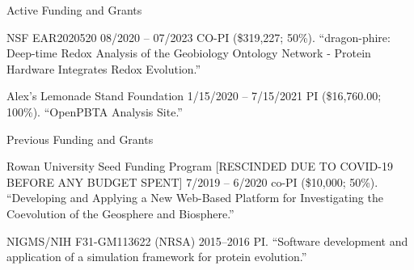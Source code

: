 \documentclass{resume} %
\begin{document}
\vspace*{0.35cm}
\begin{rSection}{Active Funding and Grants}
\vspace*{0.25cm}

\begin{rSubsection}
  {NSF EAR2020520}
  {08/2020 -- 07/2023}
  {CO-PI (\$319,227; 50\%). ``dragon-phire: Deep-time Redox Analysis of the Geobiology Ontology Network - Protein Hardware Integrates Redox Evolution.''}
\end{rSubsection}



\begin{rSubsection}
  {Alex's Lemonade Stand Foundation}
  {1/15/2020 -- 7/15/2021}
  {PI (\$16,760.00; 100\%). ``OpenPBTA Analysis Site.''}
\end{rSubsection}







\vspace*{0.35cm}
\begin{rSection}{Previous Funding and Grants}
\vspace*{0.25cm}

\begin{rSubsection}
  {Rowan University Seed Funding Program [RESCINDED DUE TO COVID-19 BEFORE ANY BUDGET SPENT]}
  {7/2019 -- 6/2020}
  {co-PI (\$10,000; 50\%). ``Developing and Applying a New Web-Based Platform for Investigating the Coevolution of the Geosphere and Biosphere.''}
\end{rSubsection}


\begin{rSubsection}
  {NIGMS/NIH F31-GM113622 (NRSA)}
  {2015--2016}
  {PI. ``Software development and application of a simulation framework for protein evolution.''}
\end{rSubsection}

\end{rSection}





\end{rSection}
\end{document}
